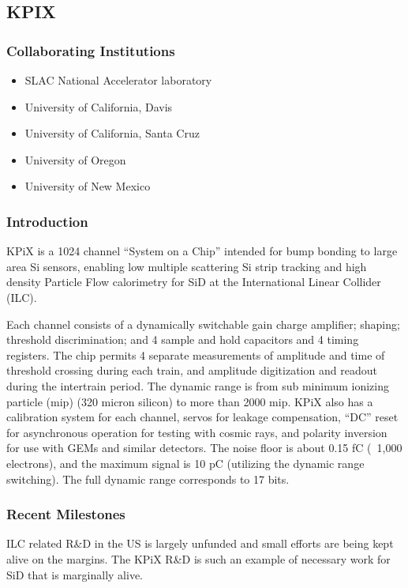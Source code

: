 \subsection{KPIX}
\subsubsection{Collaborating Institutions}
\begin{itemize}
	\item SLAC National Accelerator laboratory
	\item University of California, Davis
	\item University of California, Santa Cruz
	\item University of Oregon
	\item University of New Mexico
\end{itemize}
\subsubsection{Introduction}
KPiX is a 1024 channel ``System on a Chip'' intended for bump bonding to large area Si sensors, enabling low multiple scattering Si strip tracking and high density Particle Flow calorimetry for SiD at the International Linear Collider (ILC).

Each channel consists of a dynamically switchable gain charge amplifier; shaping; threshold discrimination; and 4 sample and hold capacitors and 4 timing registers. The chip permits 4 separate measurements of amplitude and time of threshold crossing during each train, and amplitude digitization and readout during the intertrain period. The dynamic range is from sub minimum ionizing particle (mip) (320 micron silicon) to more than 2000 mip. KPiX also has a calibration system for each channel, servos for leakage compensation, ``DC'' reset for asynchronous operation for testing with cosmic rays, and polarity inversion for use with GEMs and similar detectors. The noise floor is about 0.15 fC (~1,000 electrons), and the maximum signal is 10 pC (utilizing the dynamic range switching). The full dynamic range corresponds to 17 bits. 

\subsubsection{Recent Milestones}
ILC related R\&D in the US is largely unfunded and small efforts are being kept alive on the margins. The KPiX R\&D is such an example of necessary work for SiD that is marginally alive.
